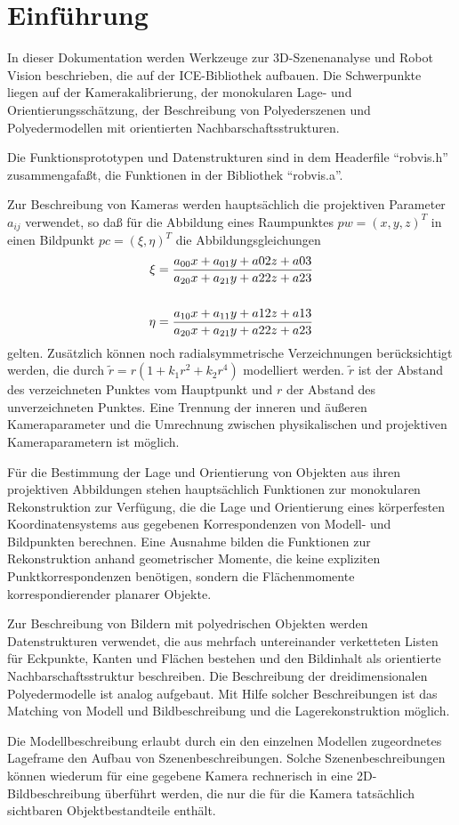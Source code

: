 \section{Einführung}

In dieser Dokumentation werden Werkzeuge zur 3D-Szenenanalyse und Robot Vision
beschrieben, die auf der ICE-Bibliothek aufbauen. Die Schwerpunkte liegen auf
der Kamerakalibrierung, der monokularen Lage- und Orientierungsschätzung, der
Beschreibung von Polyederszenen und Polyedermodellen mit orientierten
Nachbarschaftsstrukturen.

Die Funktionsprototypen und Datenstrukturen sind in dem Headerfile
``robvis.h'' zusammengafaßt, die Funktionen in der Bibliothek ``robvis.a''.

Zur Beschreibung von Kameras werden hauptsächlich die projektiven Parameter
$a_{ij}$ verwendet, so daß für die Abbildung eines Raumpunktes $pw=(x,y,z)^T$
in einen Bildpunkt $pc=(\xi,\eta)^T$ die Abbildungsgleichungen
\begin{eqnarray}
\xi ={a_{00}x+a_{01}y+a{02}z+a{03} \over
a_{20}x+a_{21}y+a{22}z+a{23}}\nonumber\cr \cr
\eta={a_{10}x+a_{11}y+a{12}z+a{13} \over a_{20}x+a_{21}y+a{22}z+a{23}}\nonumber
\end{eqnarray}
gelten. Zusätzlich können noch radialsymmetrische Verzeichnungen
berücksichtigt werden, die durch $\tilde r = r(1+k_1 r^2+k_2 r^4)$ modelliert
werden. $\tilde r$ ist der Abstand des verzeichneten Punktes vom Hauptpunkt und
$r$ der Abstand des unverzeichneten Punktes. Eine Trennung der inneren und
äußeren Kameraparameter und die Umrechnung zwischen physikalischen und
projektiven Kameraparametern ist möglich.

Für die Bestimmung der Lage und Orientierung von Objekten aus ihren
projektiven Abbildungen stehen hauptsächlich Funktionen zur monokularen
Rekonstruktion zur Verfügung, die die Lage und Orientierung eines körperfesten
Koordinatensystems aus gegebenen Korrespondenzen von Modell- und Bildpunkten
berechnen. Eine Ausnahme bilden die Funktionen zur Rekonstruktion anhand
geometrischer Momente, die keine expliziten Punktkorrespondenzen benötigen,
sondern die Flächenmomente korrespondierender planarer Objekte.

Zur Beschreibung von Bildern mit polyedrischen Objekten werden Datenstrukturen
verwendet, die aus mehrfach untereinander verketteten Listen für Eckpunkte,
Kanten und Flächen bestehen und den Bildinhalt als orientierte
Nachbarschaftsstruktur beschreiben. Die Beschreibung der dreidimensionalen
Polyedermodelle ist analog aufgebaut. Mit Hilfe solcher Beschreibungen ist das
Matching von Modell und Bildbeschreibung und die Lagerekonstruktion möglich.

Die Modellbeschreibung erlaubt durch ein den einzelnen Modellen zugeordnetes
Lageframe den Aufbau von Szenenbeschreibungen. Solche Szenenbeschreibungen
können wiederum für eine gegebene Kamera rechnerisch in eine
2D-Bildbeschreibung überführt werden, die nur die für die Kamera tatsächlich
sichtbaren Objektbestandteile enthält.
